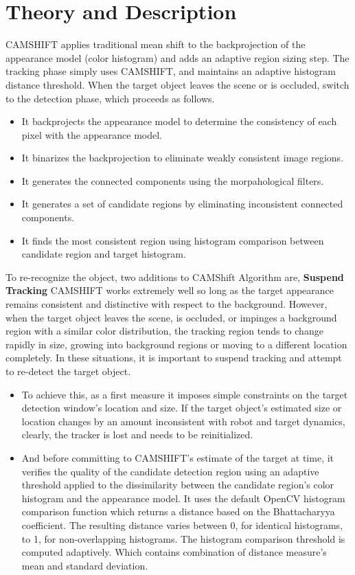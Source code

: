 \documentclass[11pt,a4paper]{article}
\begin{document}
	\section{Theory and Description}
	CAMSHIFT applies traditional mean shift to the backprojection of the appearance model (color histogram) and adds an adaptive region sizing step.
	The tracking phase simply uses CAMSHIFT, and maintains an adaptive histogram distance threshold. When the target object leaves the scene or is occluded, switch to the detection phase, which proceeds as follows.
	\begin{itemize}
	 	\item It backprojects the appearance model to determine the consistency of each pixel with the appearance model.
	 	\item It binarizes the backprojection to eliminate weakly consistent image regions.
	 	\item It generates the connected components using the morpahological filters.
	 	\item It generates a set of candidate regions by eliminating inconsistent connected components. 
	 	\item It finds the most consistent region using histogram comparison between candidate region and target histogram.
	\end{itemize}
	To re-recognize the object, two additions to CAMShift Algorithm are,
	\textbf{Suspend Tracking}\newline 
	CAMSHIFT works extremely well so long as the target appearance remains consistent and distinctive with respect to the background. However, when the target object leaves the scene, is occluded, or impinges a background region with a similar color distribution, the tracking region tends to change rapidly in
	size, growing into background regions or moving to a different location completely. In these situations, it is important to suspend tracking and attempt to re-detect the target object.
	\begin{itemize}
		\item To achieve this, as a first measure it imposes simple constraints on the target detection window’s location and size. If the target object’s estimated size or location changes by an amount inconsistent with robot and target dynamics, clearly, the tracker is lost and needs to be reinitialized.
		\item And before committing to CAMSHIFT’s estimate of the target at time, it verifies the quality of the candidate detection region using an adaptive threshold applied to the dissimilarity between the candidate region’s color histogram and the appearance model. It uses the default OpenCV histogram
		comparison function which returns a distance based on the Bhattacharyya coefficient. The resulting distance varies between 0, for identical histograms, to 1, for non-overlapping histograms. The histogram comparison threshold is computed adaptively. Which contains combination of distance measure’s mean and standard deviation.
	\end{itemize}
	
\end{document}
